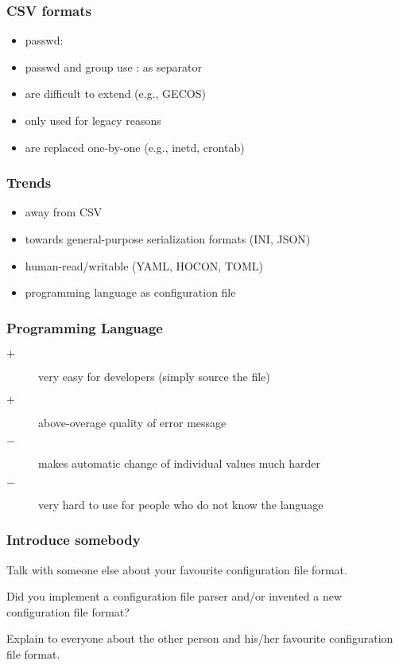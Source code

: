 \begin{frame}
	\frametitle{CSV formats}
	\begin{itemize}
	\item passwd: 
	\item passwd and group use : as separator
	\item are difficult to extend (e.g., GECOS)
	\item only used for legacy reasons
	\item are replaced one-by-one (e.g., inetd, crontab)
	\end{itemize}
\end{frame}

\begin{frame}
	\frametitle{Trends}
	\begin{itemize}
	\item away from CSV
	\item towards general-purpose serialization formats (INI, JSON)
	\item human-read/writable (YAML, HOCON, TOML)
	\item programming language as configuration file
	\end{itemize}
\end{frame}

\begin{frame}
	\frametitle{Programming Language}
	\begin{description}
	\item[$+$] very easy for developers (simply source the file)
	\item[$+$] above-overage quality of error message
	\item[$-$] makes automatic change of individual values much harder
	\item[$-$] very hard to use for people who do not know the language
	\end{description}
\end{frame}

\begin{assignment}
	\frametitle{Introduce somebody}
	\begin{task}
	Talk with someone else about your favourite configuration file format.
	\end{task}

	\begin{task}
	Did you implement a configuration file parser and/or invented a new configuration file format?
	\end{task}

	\begin{task}
	Explain to everyone about the other person and his/her favourite configuration file format.
	\end{task}
\end{assignment}

